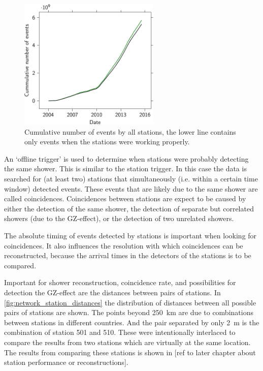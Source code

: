 \begin{figure}
    \centering
    \includegraphics[width=0.6\textwidth]
                    {plots/cluster/luminosity_network}
    \caption{Cumulative number of events by all stations, the lower line contains only events when the stations were working properly.}
    \label{fig:luminosity_network}
\end{figure}

An `offline trigger' is used to determine when stations were probably detecting the same shower. This is similar to the station trigger. In this case the data is searched for (at least two) stations that simultaneously (i.e. within a certain time window) detected events. These events that are likely due to the same shower are called coincidences. Coincidences between stations are expect to be caused by either the detection of the same shower, the detection of separate but correlated showers (due to the GZ-effect), or the detection of two unrelated showers.

The absolute timing of events detected by stations is important when looking for coincidences. It also influences the resolution with which coincidences can be reconstructed, because the arrival times in the detectors of the stations is to be compared.

Important for shower reconstruction, coincidence rate, and possibilities for detection the GZ-effect are the distances between pairs of stations. In \cref{fig:network_station_distances} the distribution of distances between all possible pairs of stations are shown. The points beyond \SI{250}{\kilo\meter} are due to combinations between stations in different countries. And the pair separated by only \SI{2}{\meter} is the combination of station 501 and 510. These were intentionally interlaced to compare the results from two stations which are virtually at the same location. The results from comparing these stations is shown in [ref to later chapter about station performance or reconstructions].

